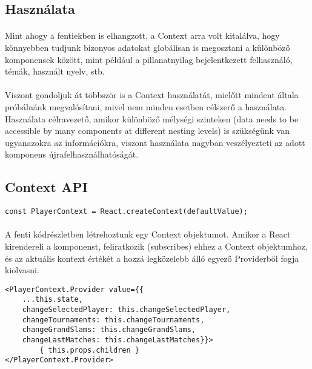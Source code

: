 \subsection{Használata}
\paragraph{}
Mint ahogy a fentiekben is elhangzott, a Context arra volt kitalálva, hogy könnyebben tudjunk bizonyos adatokat globálisan is megosztani a különböző komponensek között, mint például a pillanatnyilag bejelentkezett felhasználó, témák, használt nyelv, stb.

\paragraph{}
Viszont gondoljuk át többször is a Context használatát, mielőtt mindent általa próbálnánk megvalósítani, mivel nem minden esetben célszerű a használata. Használata célravezető,  amikor különböző mélységi szinteken (data needs to be accessible by many components at different nesting levels) is szükségünk van ugyanazokra az információkra, viszont használata nagyban veszélyezteti az adott komponens újrafelhasználhatóságát.

\subsection{Context API}

\begin{lstlisting}[caption=React Create Context]
const PlayerContext = React.createContext(defaultValue);
\end{lstlisting}

\paragraph{}
A fenti kódrészletben létrehoztunk egy Context objektumot. Amikor a React kirendereli a komponenst, feliratkozik (subscribes) ehhez a Context objektumhoz, és az aktuális kontext értékét a hozzá legközelebb álló egyező Providerből fogja kiolvasni.

\begin{lstlisting}[caption=React Context Provider]
<PlayerContext.Provider value={{ 
	...this.state, 
	changeSelectedPlayer: this.changeSelectedPlayer, 
	changeTournaments: this.changeTournaments, 
	changeGrandSlams: this.changeGrandSlams,  
	changeLastMatches: this.changeLastMatches}}>
    	{ this.props.children }
</PlayerContext.Provider>
\end{lstlisting}

